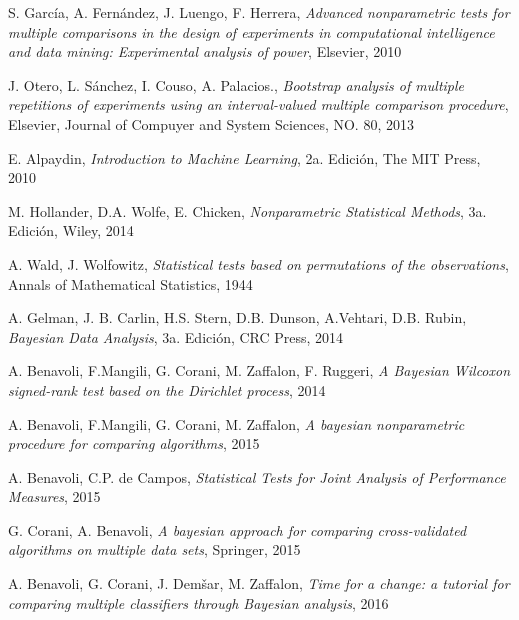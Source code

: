 \begin{thebibliography}{99}
	S. García, A. Fernández, J. Luengo, F. Herrera,
	\emph{Advanced nonparametric tests for multiple comparisons in the design of experiments in computational intelligence and data mining: Experimental analysis of power},
	Elsevier,
	2010
	
	J. Otero, L. Sánchez, I. Couso, A. Palacios.,
	\emph{Bootstrap analysis of multiple repetitions of experiments using an interval-valued multiple comparison procedure},
	Elsevier, Journal of Compuyer and System Sciences,
	NO. 80,
	2013

	E. Alpaydin,
	\emph{Introduction to Machine Learning},
	2a. Edición, 
	The MIT Press,
	2010

	M. Hollander, D.A. Wolfe, E. Chicken,
	\emph{Nonparametric Statistical Methods},
	3a. Edición,
	Wiley,
	2014

	A. Wald, J. Wolfowitz,
	\emph{Statistical tests based on permutations of the observations},
	Annals of Mathematical Statistics,
	1944
	
	A. Gelman, J. B. Carlin, H.S. Stern, D.B. Dunson, A.Vehtari, D.B. Rubin,
	\emph{Bayesian Data Analysis},
	3a. Edición,
	CRC Press,
	2014
	
	A. Benavoli, F.Mangili, G. Corani, M. Zaffalon, F. Ruggeri,
	\emph{A Bayesian Wilcoxon signed-rank test based on the Dirichlet process},
	2014
	
	A. Benavoli, F.Mangili, G. Corani, M. Zaffalon,		
	\emph{A bayesian nonparametric procedure for comparing algorithms},
	2015
	
	A. Benavoli, C.P. de Campos,		
	\emph{Statistical Tests for Joint Analysis of Performance Measures},
	2015

	G. Corani, A. Benavoli,
	\emph{A bayesian approach for comparing cross-validated algorithms on multiple data sets},
	Springer,
	2015
			
	A. Benavoli, G. Corani, J. Dem\v{s}ar, M. Zaffalon,
	\emph{Time for a change: a tutorial for comparing multiple classifiers through Bayesian analysis},
	2016
	



	
\end{thebibliography}